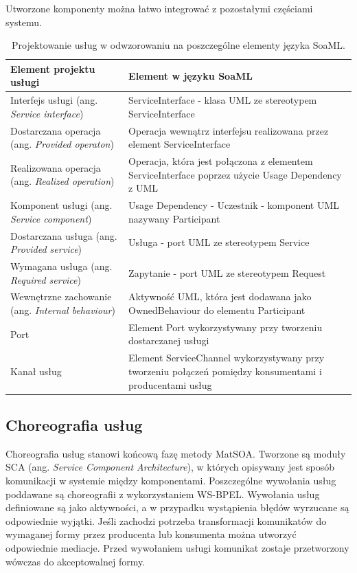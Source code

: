 Utworzone komponenty można łatwo integrować z pozostałymi częściami systemu. 

\begin{table}[!htbp]
\begin{center}
\begin{small}
\begin{supertabular}{|p{6cm}|p{7cm}|}\hline
\textbf{Element projektu usługi} & \textbf{Element w języku SoaML}\\\hline
Interfejs usługi (ang. \emph{Service interface}) &	ServiceInterface - klasa UML ze stereotypem  ServiceInterface  \\\hline
Dostarczana operacja (ang. \emph{Provided operaton}) &	Operacja wewnątrz interfejsu realizowana przez element ServiceInterface \\\hline
Realizowana operacja (ang. \emph{Realized operation}) &	Operacja, która jest połączona z elementem ServiceInterface poprzez użycie Usage Dependency z UML \\\hline
Komponent usługi (ang. \emph{Service component}) &	Usage Dependency - Uczestnik - komponent UML nazywany Participant \\\hline
Dostarczana usługa (ang. \emph{Provided service}) &	Usługa - port UML ze stereotypem Service  \\\hline
Wymagana usługa (ang. \emph{Required service}) &	Zapytanie - port UML ze stereotypem Request \\\hline
Wewnętrzne zachowanie (ang. \emph{Internal behaviour}) &	Aktywność UML, która jest dodawana jako OwnedBehaviour do elementu Participant \\\hline
Port &	Element Port wykorzystywany przy tworzeniu dostarczanej usługi\\\hline
Kanał usług &	Element ServiceChannel wykorzystywany przy tworzeniu połączeń pomiędzy konsumentami i producentami usług\\\hline
\end{supertabular}
\end{small}
\end{center}
 \caption{Projektowanie usług w odwzorowaniu na poszczególne elementy języka SoaML.}
 \label{tabela_service_projects_soaml}
\end{table}

\subsection{Choreografia usług}
Choreografia usług stanowi końcową fazę metody MatSOA. Tworzone są moduły SCA (ang. \emph{Service Component Architecture}), w których opisywany jest sposób komunikacji w systemie między komponentami. Poszczególne wywołania usług poddawane są choreografii z wykorzystaniem WS-BPEL. Wywołania usług definiowane są jako aktywności, a w przypadku wystąpienia błędów wyrzucane są odpowiednie wyjątki. Jeśli zachodzi potrzeba transformacji komunikatów do wymaganej formy przez producenta lub konsumenta można utworzyć odpowiednie mediacje. Przed wywołaniem usługi komunikat zostaje przetworzony wówczas do akceptowalnej formy.

